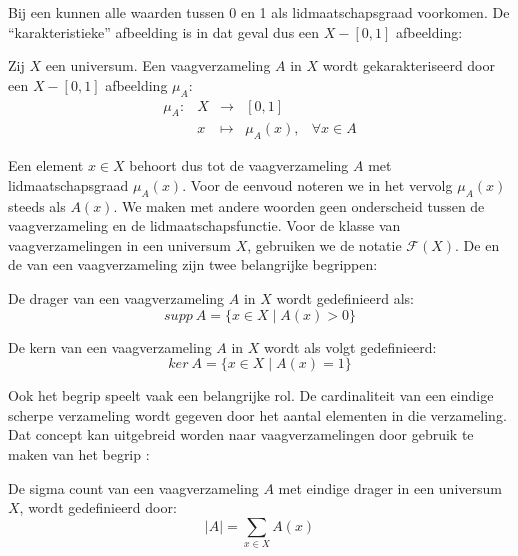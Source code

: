 Bij een  kunnen alle waarden tussen 0 en 1 als lidmaatschapsgraad 
voorkomen. De ``karakteristieke'' afbeelding is in dat geval dus een $X - [0,1]$ afbeelding:
\begin{definitie}
Zij $X$ een universum. Een vaagverzameling $A$ in $X$ wordt gekarakteriseerd door een $X - [0,1]$
afbeelding  $\mu_A$:
\begin{displaymath}
\begin{array}{lllll}
\mu_A: 	& X & \to 		& [0,1]	& \\
		& x & \mapsto 	& \mu_A(x),		& \forall x \in A
\end{array}
\end{displaymath}
\end{definitie}
\noindent
Een element $x \in X$ behoort dus tot de vaagverzameling $A$ met lidmaatschapsgraad $\mu_A(x)$.
Voor de eenvoud noteren we in het vervolg $\mu_A(x)$ steeds als $A(x)$. We maken
met andere woorden geen onderscheid tussen de vaagverzameling en de 
lidmaatschapsfunctie. Voor de klasse van vaagverzamelingen in een universum $X$, gebruiken we
de notatie $\mathcal{F}(X)$.
De  en de  van een vaagverzameling zijn twee belangrijke begrippen: 
\begin{definitie}
De drager van een vaagverzameling $A$ in $X$ wordt gedefinieerd als:
\begin{displaymath}
supp\ A = \{x \in X \mid A(x) > 0\} 
\end{displaymath}
\end{definitie}
\begin{definitie}
De kern van een vaagverzameling $A$ in $X$ wordt als volgt gedefinieerd:
\begin{displaymath}
ker\ A = \{x \in X \mid A(x) = 1\}
\end{displaymath}
\end{definitie}
\noindent
Ook het begrip  speelt vaak een belangrijke rol. De cardinaliteit van een 
eindige scherpe verzameling wordt gegeven door het aantal elementen in die verzameling. 
Dat concept kan uitgebreid worden naar vaagverzamelingen door gebruik te maken van het begrip 
:
\begin{definitie}
De sigma count van een vaagverzameling $A$ met eindige drager in een universum $X$, wordt
gedefinieerd door:
\begin{displaymath}
|A|=\sum_{x \in X} A(x)
\end{displaymath}
\end{definitie}

